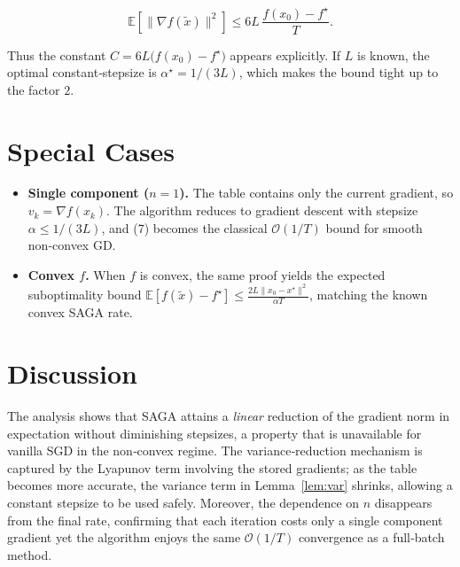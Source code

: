 \documentclass{article}
\begin{document}
\[
\mathbb{E}\!\left[\|\nabla f(\tilde x)\|^{2}\right]
\le 6L\,\frac{f(x_0)-f^{\star}}{T}.
\tag{21}
\]

Thus the constant $C=6L\big(f(x_0)-f^{\star}\big)$ appears explicitly.
If $L$ is known, the optimal constant‑stepsize is $\alpha^{\star}=1/(3L)$,
which makes the bound tight up to the factor $2$.

\section*{Special Cases}
\begin{itemize}
\item \textbf{Single component ($n=1$).} The table contains only the
current gradient, so $v_k=\nabla f(x_k)$. The algorithm reduces to
gradient descent with stepsize $\alpha\le 1/(3L)$, and (7) becomes the
classical $\mathcal{O}(1/T)$ bound for smooth non‑convex GD.
\item \textbf{Convex $f$.} When $f$ is convex, the same proof yields the
expected suboptimality bound $\mathbb{E}[f(\tilde x)-f^{\star}]
\le \frac{2L\|x_0-x^{\star}\|^{2}}{\alpha T}$, matching the known
convex SAGA rate.
\end{itemize}

\section*{Discussion}
The analysis shows that SAGA attains a \emph{linear} reduction of the
gradient norm in expectation without diminishing stepsizes, a property
that is unavailable for vanilla SGD in the non‑convex regime. The
variance‑reduction mechanism is captured by the Lyapunov term involving
the stored gradients; as the table becomes more accurate, the variance
term in Lemma~\ref{lem:var} shrinks, allowing a constant stepsize to be
used safely. Moreover, the dependence on $n$ disappears from the final
rate, confirming that each iteration costs only a single component
gradient yet the algorithm enjoys the same $\mathcal{O}(1/T)$ convergence
as a full‑batch method.

\end{document}
